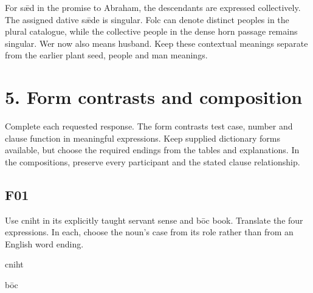 For sǣd in the promise to Abraham, the descendants are expressed collectively. The assigned dative sǣde is singular. Folc can denote distinct peoples in the plural catalogue, while the collective people in the dense horn passage remains singular. Wer now also means husband. Keep these contextual meanings separate from the earlier plant seed, people and man meanings.

\section*{5. Form contrasts and composition}

Complete each requested response. The form contrasts test case, number and clause function in meaningful expressions. Keep supplied dictionary forms available, but choose the required endings from the tables and explanations. In the compositions, preserve every participant and the stated clause relationship.

\subsection*{F01}

Use cniht in its explicitly taught servant sense and bōc book. Translate the four expressions. In each, choose the noun's case from its role rather than from an English word ending.

cniht

bōc





